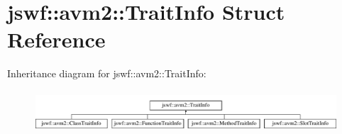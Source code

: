\hypertarget{structjswf_1_1avm2_1_1_trait_info}{\section{jswf\+:\+:avm2\+:\+:Trait\+Info Struct Reference}
\label{structjswf_1_1avm2_1_1_trait_info}
}
Inheritance diagram for jswf\+:\+:avm2\+:\+:Trait\+Info\+:\begin{figure}[H]
\begin{center}
\leavevmode
\includegraphics[height=1.564246cm]{structjswf_1_1avm2_1_1_trait_info}
\end{center}
\end{figure}
